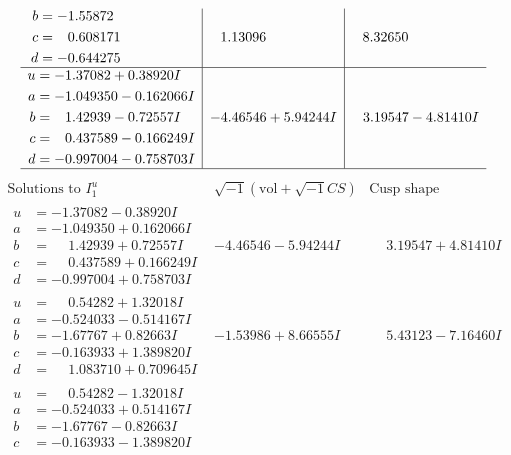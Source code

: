 \documentclass[1p]{elsarticle_modified}
\theoremstyle{definition}
\newcommand{\I}{\sqrt{-1}}
\begin{document}
$$\begin{array}{c|c|c}
\begin{aligned}
b &= -1.55872\phantom{ +0.000000I} \\
c &= \phantom{-}0.608171\phantom{ +0.000000I} \\
d &= -0.644275\phantom{ +0.000000I}\end{aligned}
 & \phantom{-}1.13096\phantom{ +0.000000I} & \phantom{-}8.32650\phantom{ +0.000000I} \\ \hline\begin{aligned}
u &= -1.37082 + 0.38920 I \\
a &= -1.049350 - 0.162066 I \\
b &= \phantom{-}1.42939 - 0.72557 I \\
c &= \phantom{-}0.437589 - 0.166249 I \\
d &= -0.997004 - 0.758703 I\end{aligned}
 & -4.46546 + 5.94244 I & \phantom{-}3.19547 - 4.81410 I\\
 \hline 
 \end{array}$$\newpage$$\begin{array}{c|c|c}  
\text{Solutions to }I^u_{1}& \I (\text{vol} + \sqrt{-1}CS) & \text{Cusp shape}\\
 \hline 
\begin{aligned}
u &= -1.37082 - 0.38920 I \\
a &= -1.049350 + 0.162066 I \\
b &= \phantom{-}1.42939 + 0.72557 I \\
c &= \phantom{-}0.437589 + 0.166249 I \\
d &= -0.997004 + 0.758703 I\end{aligned}
 & -4.46546 - 5.94244 I & \phantom{-}3.19547 + 4.81410 I \\ \hline\begin{aligned}
u &= \phantom{-}0.54282 + 1.32018 I \\
a &= -0.524033 - 0.514167 I \\
b &= -1.67767 + 0.82663 I \\
c &= -0.163933 + 1.389820 I \\
d &= \phantom{-}1.083710 + 0.709645 I\end{aligned}
 & -1.53986 + 8.66555 I & \phantom{-}5.43123 - 7.16460 I \\ \hline\begin{aligned}
u &= \phantom{-}0.54282 - 1.32018 I \\
a &= -0.524033 + 0.514167 I \\
b &= -1.67767 - 0.82663 I \\
c &= -0.163933 - 1.389820 I \\

\end{aligned}
\end{array}$$
\end{document}
